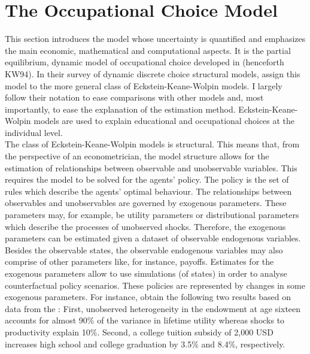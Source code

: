\newpage %

\section{The Occupational Choice Model}
\thispagestyle{plain} %
This section introduces the model whose uncertainty is quantified and emphasizes the main economic, mathematical and computational aspects. It is the partial equilibrium, dynamic model of occupational choice developed in \cite{Keane.1994} (henceforth KW94). In their survey of dynamic discrete choice structural models, \cite{Aguirregabiria.2010} assign this model to the more general class of Eckstein-Keane-Wolpin models. I largely follow their notation to ease comparisons with other models and, most importantly, to ease the explanation of the estimation method. Eckstein-Keane-Wolpin models are used to explain educational and occupational choices at the individual level. \\
\newline
The class of Eckstein-Keane-Wolpin models is structural. This means that, from the perspective of an econometrician, the model structure allows for the estimation of relationships between observable and unobservable variables. This requires the model to be solved for the agents' policy. The policy is the set of rules which describe the agents' optimal behaviour. The relationships between observables and unobservables are governed by exogenous parameters. These parameters may, for example, be utility parameters or distributional parameters which describe the processes of unobserved shocks. Therefore, the exogenous parameters can be estimated given a dataset of observable endogenous variables. Besides the observable states, the observable endogenous variables may also comprise of other parameters like, for instance, payoffs. Estimates for the exogenous parameters allow to use simulations (of states) in order to analyse counterfactual policy scenarios. These policies are represented by changes in some exogenous parameters. For instance, \cite{Keane.1997} obtain the following two results based on data from the : First, unobserved heterogeneity in the endowment at age sixteen accounts for almost 90\% of the variance in lifetime utility whereas shocks to productivity explain 10\%. Second, a college tuition subsidy of 2,000 USD increases high school and college graduation by 3.5\% and 8.4\%, respectively.\\
\newline
